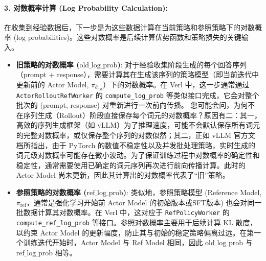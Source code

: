 \documentclass{pkuthesis}
\begin{document}
\paragraph{3. 对数概率计算 (Log Probability Calculation):}
在收集到经验数据后，下一步是为这些数据计算在当前策略和参照策略下的对数概率 (log probabilities)。这些对数概率是后续计算优势函数和策略损失的关键输入。
\begin{itemize}
    \item \textbf{旧策略的对数概率 ($\text{old\_log\_prob}$)}: 对于经验收集阶段生成的每个回答序列（prompt + response），需要计算其在生成该序列的策略模型（即当前迭代中更新前的 Actor Model, $\pi_{\theta_{\text{old}}}$）下的对数概率。在 Verl 中，这一步通常通过 \texttt{ActorRolloutRefWorker} 的 \texttt{compute\_log\_prob} 等类似接口完成，它会对整个批次的 (prompt, response) 对重新进行一次前向传播。
    您可能会问，为何不在序列生成（Rollout）阶段直接保存每个词元的对数概率？原因有二：其一，高效的序列生成框架（如 vLLM）为了推理速度，可能不会默认保存所有词元的完整对数概率，或仅保存整个序列的对数似然；其二，正如 vLLM 官方文档所指出，由于 PyTorch 的数值不稳定性以及并发批处理策略，实时生成的词元级对数概率可能存在微小波动。为了保证训练过程中对数概率的确定性和稳定性，通常需要使用已确定的词元序列再次进行前向传播计算。此时的 Actor Model 尚未更新，因此其计算出的对数概率代表了“旧”策略。

    \item \textbf{参照策略的对数概率 ($\text{ref\_log\_prob}$)}: 类似地，参照策略模型 (Reference Model, $\pi_{\text{ref}}$，通常是强化学习开始前 Actor Model 的初始版本或SFT版本) 也会对同一批数据计算其对数概率。在 Verl 中，这对应于 \texttt{RefPolicyWorker} 的 \texttt{compute\_ref\_log\_prob} 等接口。参照对数概率主要用于后续计算 KL 散度，以约束 Actor Model 的更新幅度，防止其与初始的稳定策略偏离过远。在第一个训练迭代开始时，Actor Model 与 Ref Model 相同，因此 $\text{old\_log\_prob}$ 与 $\text{ref\_log\_prob}$ 相等。
\end{itemize}
\end{document}

